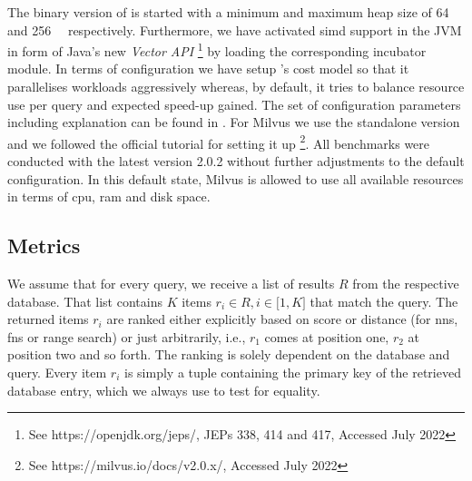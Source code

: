 The binary version of \cottontail{} is started with a minimum and maximum heap size of \SI{64}{\giga\byte} and \SI{256}{\giga\byte} respectively. Furthermore, we have activated \acrshort{simd} support in the JVM in form of Java's new \emph{Vector API} \footnote{See https://openjdk.org/jeps/, JEPs 338, 414 and 417, Accessed July 2022} by loading the corresponding incubator module. In terms of configuration we have setup \cottontail{}'s cost model so that it parallelises workloads aggressively whereas, by default, it tries to balance resource use per query and expected speed-up gained. The set of configuration parameters including explanation can be found in . For Milvus we use the standalone version and we followed the official tutorial for setting it up \footnote{See https://milvus.io/docs/v2.0.x/, Accessed July 2022}. All benchmarks were conducted with the latest version 2.0.2 without further adjustments to the default configuration. In this default state, Milvus is allowed to use all available resources in terms of \acrshort{cpu}, \acrshort{ram} and disk space.

\subsection{Metrics}

We assume that for every query, we receive a list of results $R$ from the respective database. That list contains $K$ items $r_i \in R, i \in \lbrack 1, K  \rbrack $ that match the query. The returned items $r_i$ are ranked either explicitly based on score or distance (for \acrshort{nns}, \acrshort{fns} or range search) or just arbitrarily, i.e., $r_1$ comes at position one, $r_2$ at position two and so forth. The ranking is solely dependent on the database and query. Every item $r_i$ is simply a tuple containing the primary key of the retrieved database entry, which we always use to test for equality.

